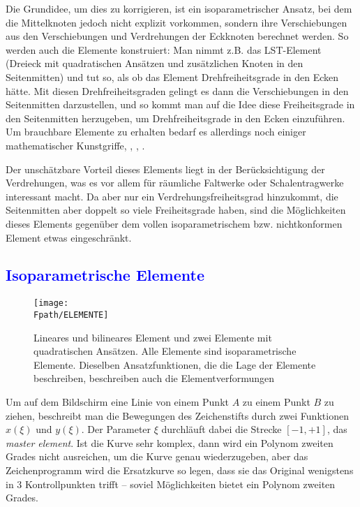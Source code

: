 {Die Grundidee, um dies zu korrigieren, ist ein isoparametrischer Ansatz, bei dem die
Mittelknoten jedoch nicht explizit vorkommen, sondern ihre Verschiebungen aus den
Verschiebungen und Verdrehungen der Eckknoten berechnet werden. So werden auch die
Elemente konstruiert: Man nimmt z.B. das LST-Element (Dreieck mit quadratischen Ans\"{a}tzen
und zus\"{a}tzlichen Knoten in den Seitenmitten) und tut so, als ob das Element
Drehfreiheitsgrade in den Ecken h\"{a}tte. Mit diesen Drehfreiheitsgraden gelingt es dann die
Verschiebungen in den Seitenmitten darzustellen, und so kommt man auf die Idee diese
Freiheitsgrade in den Seitenmitten herzugeben, um Drehfreiheitsgrade in den Ecken
einzuf\"{u}hren. Um brauchbare Elemente zu erhalten bedarf es allerdings noch einiger
mathematischer Kunstgriffe, \cite{Cook0}, \cite{Bergan}, \cite{Allman}.

Der unsch\"{a}tzbare Vorteil dieses Elements liegt in der Ber\"{u}cksichtigung der Verdrehungen,
was es vor allem f\"{u}r r\"{a}umliche Faltwerke oder Schalentragwerke interessant macht. Da
aber nur ein Verdrehungsfreiheitsgrad hinzukommt, die Seitenmitten aber doppelt so viele
Freiheitsgrade haben, sind die M\"{o}glichkeiten dieses Elements gegen\"{u}ber dem vollen
isoparametrischem bzw. nichtkonformen Element etwas eingeschr\"{a}nkt.


{\textcolor{blue}{\subsection{Isoparametrische Elemente}}}
\begin{figure}[tbp]
\if {} \sidecaption \fi
\texttt{[image: \\Fpath/ELEMENTE]}
\caption{Lineares und bilineares Element und zwei Elemente mit quadratischen Ans\"{a}tzen.
Alle Elemente sind isoparametrische Elemente. Dieselben Ansatzfunktionen, die die Lage
der Elemente beschreiben, beschreiben auch die Elementverformungen} \label{ElementeIso}
\end{figure}%
Um auf dem Bildschirm eine Linie von einem Punkt $A$ zu einem Punkt $B$ zu ziehen,
beschreibt man die Bewegungen des Zeichenstifts durch zwei Funktionen $x(\xi)$ und
$y(\xi)$. Der Parameter $\xi$ durchl\"{a}uft dabei die Strecke $[-1,+1]$, das {\em master
element\/}. Ist die Kurve sehr komplex, dann wird ein Polynom
zweiten Grades nicht ausreichen, um die Kurve genau wiederzugeben, aber das
Zeichenprogramm wird die Ersatzkurve so legen, dass sie das Original wenigstens in 3
Kontrollpunkten trifft -- soviel M\"{o}glichkeiten bietet ein Polynom zweiten Grades.

}

